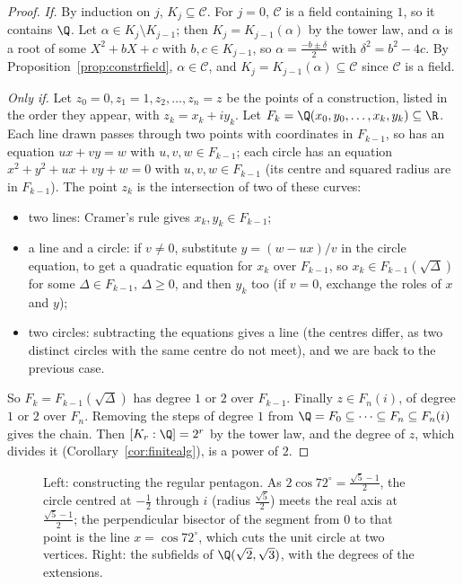 \begin{proof}
\emph{If.} By induction on $j$, $K_j\subseteq\mathcal C$. For $j=0$, $\mathcal C$ is a field containing $1$, so it contains $\Q$. Let $\alpha\in K_j\setminus K_{j-1}$; then $K_j=K_{j-1}(\alpha)$ by the tower law, and $\alpha$ is a root of some $X^2+bX+c$ with $b,c\in K_{j-1}$, so $\alpha=\frac{-b\pm\delta}2$ with $\delta^2=b^2-4c$. By Proposition~\ref{prop:constrfield}, $\alpha\in\mathcal C$, and $K_j=K_{j-1}(\alpha)\subseteq\mathcal C$ since $\mathcal C$ is a field.

\emph{Only if.} Let $z_0=0,z_1=1,z_2,\dots,z_n=z$ be the points of a construction, listed in the order they appear, with $z_k=x_k+iy_k$. Let $F_k=\Q(x_0,y_0,\dots,x_k,y_k)\subseteq\R$. Each line drawn passes through two points with coordinates in $F_{k-1}$, so has an equation $ux+vy=w$ with $u,v,w\in F_{k-1}$; each circle has an equation $x^2+y^2+ux+vy+w=0$ with $u,v,w\in F_{k-1}$ (its centre and squared radius are in $F_{k-1}$). The point $z_k$ is the intersection of two of these curves:
\begin{itemize}
\item two lines: Cramer's rule gives $x_k,y_k\in F_{k-1}$;
\item a line and a circle: if $v\ne0$, substitute $y=(w-ux)/v$ in the circle equation, to get a quadratic equation for $x_k$ over $F_{k-1}$, so $x_k\in F_{k-1}(\sqrt\Delta)$ for some $\Delta\in F_{k-1}$, $\Delta\ge0$, and then $y_k$ too (if $v=0$, exchange the roles of $x$ and $y$);
\item two circles: subtracting the equations gives a line (the centres differ, as two distinct circles with the same centre do not meet), and we are back to the previous case.
\end{itemize}
So $F_k=F_{k-1}(\sqrt\Delta)$ has degree $1$ or $2$ over $F_{k-1}$. Finally $z\in F_n(i)$, of degree $1$ or $2$ over $F_n$. Removing the steps of degree $1$ from $\Q=F_0\subseteq\dots\subseteq F_n\subseteq F_n(i)$ gives the chain. Then $[K_r:\Q]=2^r$ by the tower law, and the degree of $z$, which divides it (Corollary~\ref{cor:finitealg}), is a power of $2$.
\end{proof}

\begin{figure}[ht]
\centering
{}
\caption{Left: constructing the regular pentagon. As $2\cos72^\circ=\frac{\sqrt5-1}2$, the circle centred at $-\frac12$ through $i$ (radius $\frac{\sqrt5}2$) meets the real axis at $\frac{\sqrt5-1}2$; the perpendicular bisector of the segment from $0$ to that point is the line $x=\cos72^\circ$, which cuts the unit circle at two vertices. Right: the subfields of $\Q(\sqrt2,\sqrt3)$, with the degrees of the extensions.}
\label{fig:pentagon}
\end{figure}

